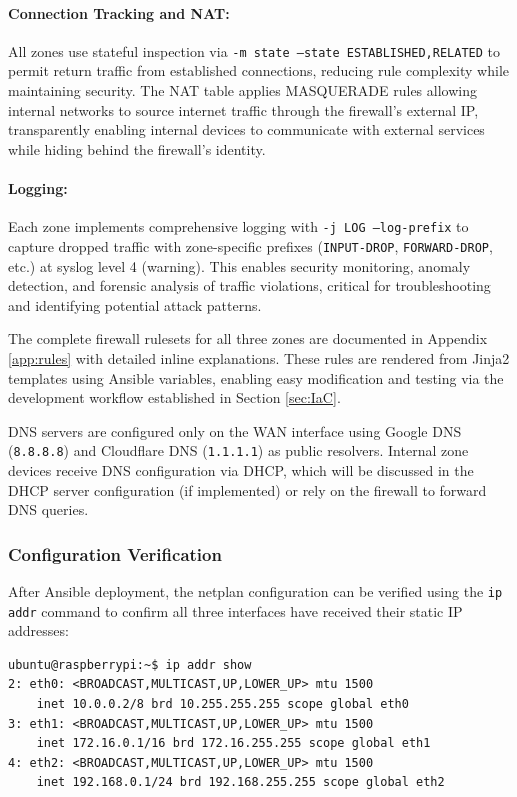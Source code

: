 \paragraph{Connection Tracking and NAT:} All zones use stateful inspection via \texttt{-m state --state ESTABLISHED,RELATED} to permit return traffic from established connections, reducing rule complexity while maintaining security. The NAT table applies MASQUERADE rules allowing internal networks to source internet traffic through the firewall's external IP, transparently enabling internal devices to communicate with external services while hiding behind the firewall's identity.

\paragraph{Logging:} Each zone implements comprehensive logging with \texttt{-j LOG --log-prefix} to capture dropped traffic with zone-specific prefixes (\texttt{INPUT-DROP}, \texttt{FORWARD-DROP}, etc.) at syslog level 4 (warning). This enables security monitoring, anomaly detection, and forensic analysis of traffic violations, critical for troubleshooting and identifying potential attack patterns.

The complete firewall rulesets for all three zones are documented in Appendix \ref{app:rules} with detailed inline explanations. These rules are rendered from Jinja2 templates using Ansible variables, enabling easy modification and testing via the development workflow established in Section \ref{sec:IaC}.

DNS servers are configured only on the WAN interface using Google DNS (\texttt{8.8.8.8}) and Cloudflare DNS (\texttt{1.1.1.1}) as public resolvers. Internal zone devices receive DNS configuration via DHCP, which will be discussed in the DHCP server configuration (if implemented) or rely on the firewall to forward DNS queries.

\subsubsection{Configuration Verification}
\label{subsubsec:netplan-verify}

After Ansible deployment, the netplan configuration can be verified using the \texttt{ip addr} command to confirm all three interfaces have received their static IP addresses:

\begin{verbatim}
ubuntu@raspberrypi:~$ ip addr show
2: eth0: <BROADCAST,MULTICAST,UP,LOWER_UP> mtu 1500
    inet 10.0.0.2/8 brd 10.255.255.255 scope global eth0
3: eth1: <BROADCAST,MULTICAST,UP,LOWER_UP> mtu 1500
    inet 172.16.0.1/16 brd 172.16.255.255 scope global eth1
4: eth2: <BROADCAST,MULTICAST,UP,LOWER_UP> mtu 1500
    inet 192.168.0.1/24 brd 192.168.255.255 scope global eth2
\end{verbatim}

